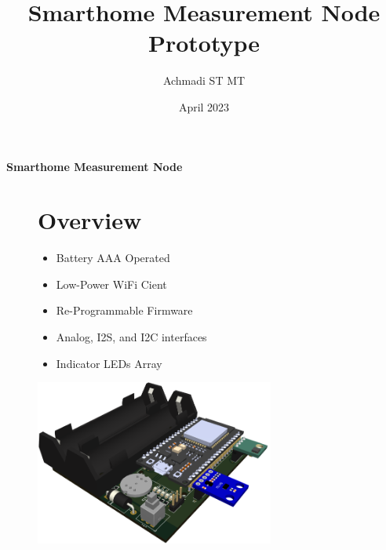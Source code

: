 \documentclass[a4paper,12pt,oneside,pdflatex,italian,final,twocolumn]{article}
\title{Smarthome Measurement Node Prototype}
\author{Achmadi ST MT}
\date{April 2023}
\begin{document}
	\pagestyle{fancy}

	\chead{\today}

	\onecolumn

	\begin{figure}

	\end{figure}\begin{minipage}{0.47\textwidth}
		\centering

	\end{minipage}
	\hfill
	\begin{minipage}{0.47\textwidth}
		\raggedleft
		\Huge \textbf{Smarthome Measurement Node}
	\end{minipage}

	\begin{figure}
		\begin{minipage}{0.47\textwidth}

			\section{Overview}
			\begin{itemize}
				\item Battery AAA Operated
				\item Low-Power WiFi Cient
				\item Re-Programmable Firmware
				\item Analog, I2S, and I2C interfaces
				\item Indicator LEDs Array
			\end{itemize}


		\end{minipage}
		\hfill
		\begin{minipage}{0.47\textwidth}
			\centering
			\includegraphics[width=0.7\textwidth,right]{images/view_ortho.png}

	\end{minipage}
	\end{figure}
\end{document}
